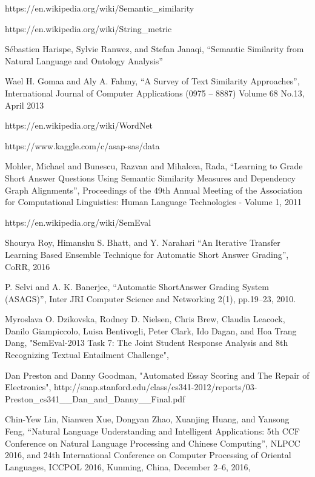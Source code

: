 \documentclass{article}
\begin{document}
\begin{thebibliography}{9}


https://en.wikipedia.org/wiki/Semantic\_similarity


https://en.wikipedia.org/wiki/String\_metric


Sébastien Harispe, Sylvie Ranwez, and Stefan Janaqi, ``Semantic Similarity from Natural Language and Ontology Analysis'' 

Wael H. Gomaa and Aly A. Fahmy, ``A Survey of Text Similarity Approaches'', International Journal of Computer Applications (0975 – 8887) Volume 68 No.13, April 2013

https://en.wikipedia.org/wiki/WordNet

https://www.kaggle.com/c/asap-sas/data

Mohler, Michael and Bunescu, Razvan and Mihalcea, Rada, ``Learning to Grade Short Answer Questions Using Semantic Similarity Measures and Dependency Graph Alignments'', Proceedings of the 49th Annual Meeting of the Association for Computational Linguistics: Human Language Technologies - Volume 1, 2011


https://en.wikipedia.org/wiki/SemEval

Shourya Roy, Himanshu S. Bhatt, and Y. Narahari ``An Iterative Transfer Learning Based Ensemble Technique for Automatic Short Answer Grading'', CoRR, 2016

 P. Selvi and A. K. Banerjee, ``Automatic ShortAnswer Grading System
(ASAGS)'', Inter JRI Computer Science and Networking 2(1), pp.19–23, 2010.

Myroslava O. Dzikovska, Rodney D. Nielsen, Chris Brew, Claudia Leacock, Danilo Giampiccolo, Luisa Bentivogli, Peter Clark, Ido Dagan, and Hoa Trang Dang, "SemEval-2013 Task 7: The Joint Student Response Analysis and 8th
Recognizing Textual Entailment Challenge", 


Dan Preston and Danny Goodman, "Automated Essay Scoring and The Repair of Electronics", http://snap.stanford.edu/class/cs341-2012/reports/03-Preston\_cs341\_\-\_Dan\_and\_Danny\_\-\_Final.pdf

Chin-Yew Lin, Nianwen Xue, Dongyan Zhao, Xuanjing Huang, and Yansong Feng, ``Natural Language Understanding and Intelligent Applications: 5th CCF Conference on Natural Language Processing and Chinese Computing'', NLPCC 2016, and 24th International Conference on Computer Processing of Oriental Languages, ICCPOL 2016, Kunming, China, December 2–6, 2016,



\end{thebibliography}
\end{document}
